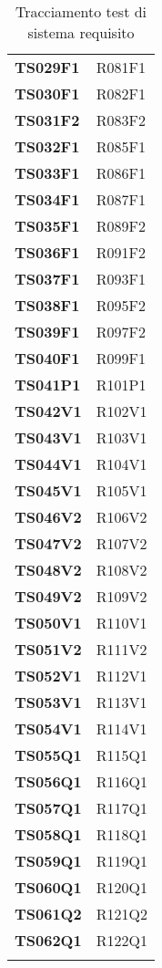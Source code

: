 \documentclass[../../piano-di-qualifica.tex]{subfiles}
\begin{document}
\begin{longtable}[H]{>{\centering\bfseries}m{5cm} >{\centering\arraybackslash}m{5cm}}
  TS029F1 & R081F1 \\
  TS030F1 & R082F1 \\
  TS031F2 & R083F2 \\
  TS032F1 & R085F1 \\
  TS033F1 & R086F1 \\
  TS034F1 & R087F1 \\
  TS035F1 & R089F2 \\
  TS036F1 & R091F2 \\
  TS037F1 & R093F1 \\
  TS038F1 & R095F2 \\
  TS039F1 & R097F2 \\
  TS040F1 & R099F1 \\
  TS041P1 & R101P1 \\
  TS042V1 & R102V1 \\
  TS043V1 & R103V1 \\
  TS044V1 & R104V1 \\
  TS045V1 & R105V1 \\
  TS046V2 & R106V2 \\
  TS047V2 & R107V2 \\
  TS048V2 & R108V2 \\
  TS049V2 & R109V2 \\
  TS050V1 & R110V1 \\
  TS051V2 & R111V2 \\
  TS052V1 & R112V1 \\
  TS053V1 & R113V1 \\
  TS054V1 & R114V1 \\
  TS055Q1 & R115Q1 \\
  TS056Q1 & R116Q1 \\
  TS057Q1 & R117Q1 \\
  TS058Q1 & R118Q1 \\
  TS059Q1 & R119Q1 \\
  TS060Q1 & R120Q1 \\
  TS061Q2 & R121Q2 \\
  TS062Q1 & R122Q1 \\


 




  \rowcolor{white}
  \caption{Tracciamento test di sistema \- requisito}%
  \label{tab:test_sistema_requisito}
\end{longtable}
\end{document}
